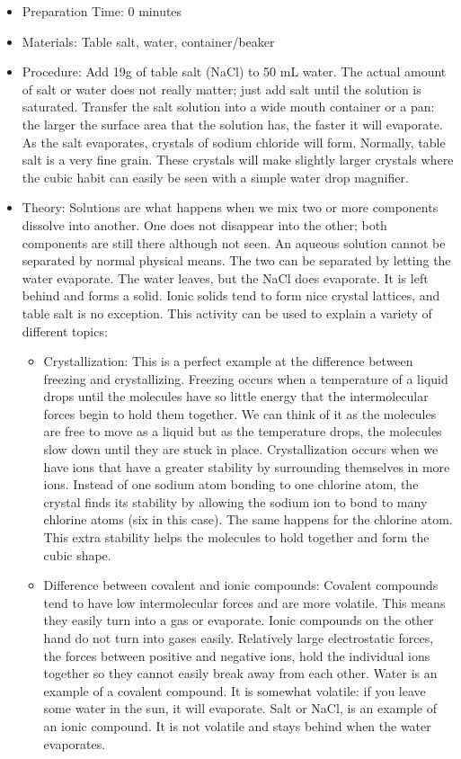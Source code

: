 \begin{itemize}
\item{Preparation Time: 0 minutes}
\item{Materials: Table salt, water, container/beaker}
\item{Procedure: Add 19g of table salt (NaCl) to 50 mL water. The actual amount of salt or water does not really matter; just add salt until the solution is saturated. Transfer the salt solution into a wide mouth container or a pan: the larger the surface area that the solution has, the faster it will evaporate. As the salt evaporates, crystals of sodium chloride will form. Normally, table salt is a very fine grain. These crystals will make slightly larger crystals where the cubic habit can easily be seen with a simple water drop magnifier.}

\item{Theory: Solutions are what happens when we mix two or more components dissolve into another. One does not disappear into the other; both components are still there although not seen. An aqueous solution cannot be separated by normal physical means. The two can be separated by letting the water evaporate. The water leaves, but the NaCl does evaporate. It is left behind and forms a solid. Ionic solids tend to form nice crystal lattices, and table salt is no exception. This activity can be used to explain a variety of different topics:

\begin{itemize}
\item{Crystallization: This is a perfect example at the difference between freezing and crystallizing. Freezing occurs when a temperature of a liquid drops until the molecules have so little energy that the intermolecular forces begin to hold them together. We can think of it as the molecules are free to move as a liquid but as the temperature drops, the molecules slow down until they are stuck in place. Crystallization occurs when we have ions that have a greater stability by surrounding themselves in more ions. Instead of one sodium atom bonding to one chlorine atom, the crystal finds its stability by allowing the sodium ion to bond to many chlorine atoms (six in this case). The same happens for the chlorine atom. This extra stability helps the molecules to hold together and form the cubic shape.}
\item{Difference between covalent and ionic compounds: Covalent compounds tend to have low intermolecular forces and are more volatile. This means they easily turn into a gas or evaporate. Ionic compounds on the other hand do not turn into gases easily. Relatively large electrostatic forces, the forces between positive and negative ions, hold the individual ions together so they cannot easily break away from each other. Water is an example of a covalent compound. It is somewhat volatile: if you leave some water in the sun, it will evaporate. Salt or NaCl, is an example of an ionic compound. It is not volatile and stays behind when the water evaporates.}
\end{itemize}
}
\end{itemize}

